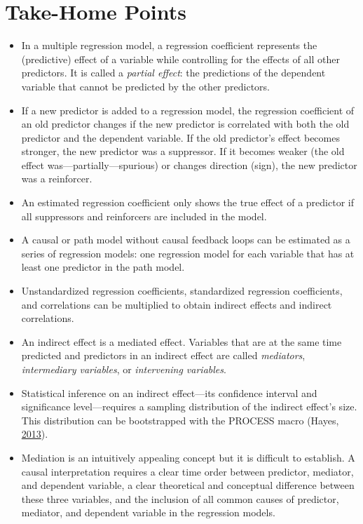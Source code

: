 \documentclass[a4paper]{book}
\theoremstyle{definition}
\theoremstyle{definition}
\theoremstyle{definition}
\theoremstyle{remark}
\begin{document}
\section{Take-Home Points}\label{take-home-points-8}

\begin{itemize}
\item
  In a multiple regression model, a regression coefficient represents
  the (predictive) effect of a variable while controlling for the
  effects of all other predictors. It is called a \emph{partial effect}:
  the predictions of the dependent variable that cannot be predicted by
  the other predictors.
\item
  If a new predictor is added to a regression model, the regression
  coefficient of an old predictor changes if the new predictor is
  correlated with both the old predictor and the dependent variable. If
  the old predictor's effect becomes stronger, the new predictor was a
  suppressor. If it becomes weaker (the old effect
  was---partially---spurious) or changes direction (sign), the new
  predictor was a reinforcer.
\item
  An estimated regression coefficient only shows the true effect of a
  predictor if all suppressors and reinforcers are included in the
  model.
\item
  A causal or path model without causal feedback loops can be estimated
  as a series of regression models: one regression model for each
  variable that has at least one predictor in the path model.
\item
  Unstandardized regression coefficients, standardized regression
  coefficients, and correlations can be multiplied to obtain indirect
  effects and indirect correlations.
\item
  An indirect effect is a mediated effect. Variables that are at the
  same time predicted and predictors in an indirect effect are called
  \emph{mediators}, \emph{intermediary variables}, or \emph{intervening
  variables}.
\item
  Statistical inference on an indirect effect---its confidence interval
  and significance level---requires a sampling distribution of the
  indirect effect's size. This distribution can be bootstrapped with the
  PROCESS macro (Hayes, \protect\hyperlink{ref-RefWorks:3873}{2013}).
\item
  Mediation is an intuitively appealing concept but it is difficult to
  establish. A causal interpretation requires a clear time order between
  predictor, mediator, and dependent variable, a clear theoretical and
  conceptual difference between these three variables, and the inclusion
  of all common causes of predictor, mediator, and dependent variable in
  the regression models.
\end{itemize}
\end{document}
